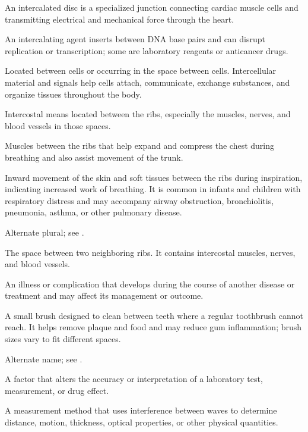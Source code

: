  An intercalated disc is a specialized junction connecting cardiac muscle cells and transmitting electrical and mechanical force through the heart.

 An intercalating agent inserts between DNA base pairs and can disrupt replication or transcription; some are laboratory reagents or anticancer drugs.

 Located between cells or occurring in the space between cells. Intercellular material and signals help cells attach, communicate, exchange substances, and organize tissues throughout the body.

 Intercostal means located between the ribs, especially the muscles, nerves, and blood vessels in those spaces.

 Muscles between the ribs that help expand and compress the chest during breathing and also assist movement of the trunk.

 Inward movement of the skin and soft tissues between the ribs during inspiration,
indicating increased work of breathing. It is common in infants and children with
respiratory distress and may accompany airway obstruction, bronchiolitis, pneumonia,
asthma, or other pulmonary disease.

 Alternate plural; see .

 The space between two neighboring ribs. It contains intercostal muscles, nerves, and blood vessels.

 An illness or complication that develops during the course of another disease or treatment and may affect its management or outcome.

 A small brush designed to clean between teeth where a regular toothbrush cannot reach. It helps remove plaque and food and may reduce gum inflammation; brush sizes vary to fit different spaces.

 Alternate name; see .

 A factor that alters the accuracy or interpretation of a laboratory test, measurement, or drug effect.

 A measurement method that uses interference between waves to determine distance, motion, thickness, optical properties, or other physical quantities.

